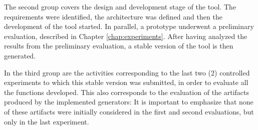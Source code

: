 The second group covers the design and development stage of the tool.
The requirements were identified, the architecture was defined and then the development of the tool started.
In parallel, a prototype underwent a preliminary evaluation, described in Chapter \ref{chap:experiments}.
After having analyzed the results from the preliminary evaluation, a stable version of the tool is then generated.


In the third group are the activities corresponding to the last two (2) controlled experiments to which this stable version was submitted, in order to evaluate all the functions developed.
This also corresponds to the evaluation of the artifacts produced by the implemented generators:
It is important to emphasize that none of these artifacts were initially considered in the first and second evaluations, but only in the last experiment.

